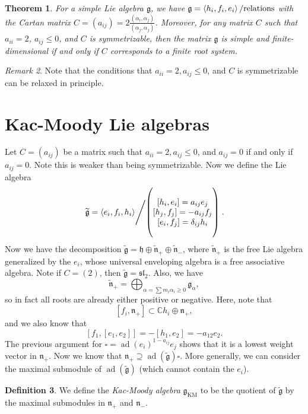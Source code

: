 \documentclass[leqno, openany]{memoir}
\newtheorem{thm}{Theorem}[section]
\theoremstyle{definition}
\newtheorem{defn}[thm]{Definition}
\theoremstyle{remark}
\newtheorem{rmk}[thm]{Remark}
\theoremstyle{plain}
\theoremstyle{definition}
\theoremstyle{remark}
\newcommand{\C}{\mathbb{C}}
\newcommand{\mf}[1]{\mathfrak{#1}}
\newcommand{\mr}[1]{\mathrm{#1}}
\newcommand{\wtl}[1]{\widetilde{#1}}
\DeclareMathOperator{\ad}{ad}
\begin{document}
\begin{thm}
    For a simple Lie algebra $\mf{g}$, we have $\mf{g} = \ev{h_i, f_i, e_i} / \text{relations}$ with the Cartan matrix $C = (a_{ij}) = 2 \frac{(\alpha_i, \alpha_j)}{(\alpha_j, \alpha_j)}$. Moreover, for any matrix $C$ such that $a_{ii} = 2$, $a_{ij} \leq 0$, and $C$ is symmetrizable, then the matrix $\mf{g}$ is simple and finite-dimensional if and only if $C$ corresponds to a finite root system.
\end{thm}

\begin{rmk}
    Note that the conditions that $a_{ii} = 2, a_{ij} \leq 0$, and $C$ is symmetrizable can be relaxed in principle.
\end{rmk}

\section{Kac-Moody Lie algebras}%
\label{sec:kac_moody_lie_algebras}

Let $C = (a_{ij})$ be a matrix such that $a_{ii} = 2, a_{ij} \leq 0$, and $a_{ij} = 0$ if and only if $a_{ij} = 0$. Note this is weaker than being symmetrizable. Now we define the Lie algebra
\[ \left. \wtl{\mf{g}} = \ev{e_i, f_i, h_i} \middle/ \qty( \Vectorstack{ {[h_i, e_i] = a_{ij} e_j} {[h_j, f_j] = -a_{ij} f_j} {[e_i, f_j] = \delta_{ij} h_i} } ) \right. . \]
Now we have the decomposition $\wtl{\mf{g}} = \mf{h} \oplus \wtl{\mf{n}}_+ \oplus \wtl{\mf{n}}_-$, where $\wtl{\mf{n}}_+$ is the free Lie algebra generalized by the $e_i$, whose universal enveloping algebra is a free associative algebra. Note if $C = (2)$, then $\wtl{\mf{g}} = \mf{sl}_2$. Also, we have
\[ \wtl{\mf{n}}_+ = \bigoplus_{\alpha = \sum m_i \alpha_i \geq 0} \mf{g}_{\alpha}, \]
so in fact all roots are already either positive or negative. Here, note that
\[ [f_i, \mf{n}_+] \subset \C h_i \oplus \mf{n}_+, \]
and we also know that
\[ [f_1, [e_1, e_2]] = -[h_1, e_2] = -a_{12} e_2. \]
The previous argument for $\square = {\ad(e_i)}^{1-a_{ij}} e_j$ shows that it is a lowest weight vector in $\mf{n}_+$. Now we know that $\mf{n}_+ \supseteq \ad(\wtl{\mf{g}}) \square$. More generally, we can consider the maximal submodule of $\ad(\wtl{\mf{g}})$ (which cannot contain the $e_i$). 

\begin{defn}
    We define the \textit{Kac-Moody algebra} $\mf{g}_{\mr{KM}}$ to be the quotient of $\wtl{\mf{g}}$ by the maximal submodules in $\mf{n}_+$ and $\mf{n}_-$.
\end{defn}
\end{document}
